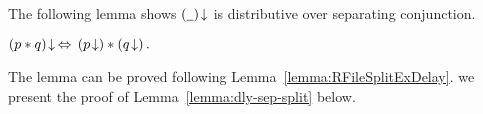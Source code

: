 The following lemma shows ${(\underline{\ \,})}\!\downarrow$ is distributive
over separating conjunction.
\begin{lemma} %
\label{lemma:dly-sep-split}
$
{(p * q)}\!\downarrow \,\Leftrightarrow\, ({p}\!\downarrow) * ({q}\!\downarrow)\,.
$
\end{lemma}
The lemma can be proved following 
Lemma~\ref{lemma:RFileSplitExDelay}. 
we present the proof of 
Lemma~\ref{lemma:dly-sep-split} below.
